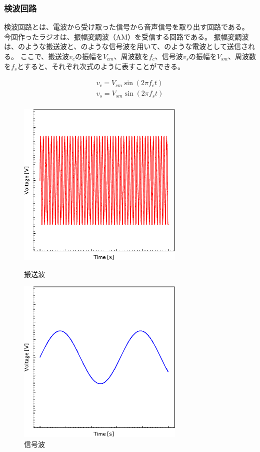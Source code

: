 \documentclass[report.tex]{subfiles}
\begin{document}
\subsubsection{検波回路}

検波回路とは、電波から受け取った信号から音声信号を取り出す回路である。
今回作ったラジオは、振幅変調波（AM）を受信する回路である。
振幅変調波は、のような搬送波と、のような信号波を用いて、のような電波として送信される。
ここで、搬送波\(v_c\)の振幅を\(V_{cm}\)、周波数を\(f_c\)、信号波\(v_s\)の振幅を\(V_{sm}\)、周波数を\(f_s\)とすると、それぞれ次式のように表すことができる。

\begin{align}
	v_c = V_{cm} \sin(2 \pi f_c t) \\
	v_s = V_{sm} \sin(2 \pi f_s t) \\
\end{align}

\begin{figure}[H]
	\begin{minipage}[b]{0.5\columnwidth}
		\centering
		\includegraphics[width=8cm]{fig/5V.pdf}
		\caption{搬送波}
		\label{fig:5V}
	\end{minipage}
	\begin{minipage}[b]{0.5\columnwidth}
		\centering
		\includegraphics[width=8cm]{fig/3V.pdf}
		\caption{信号波}
		\label{fig:3V}
	\end{minipage}
\end{figure}
\end{document}
